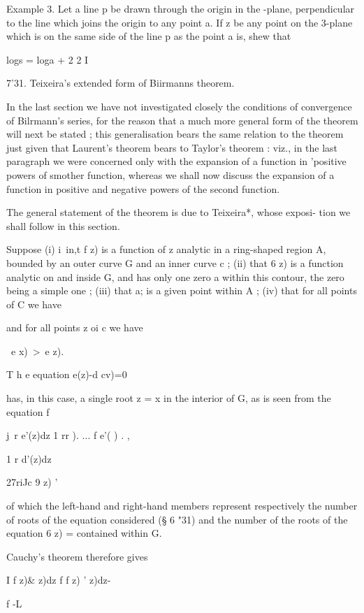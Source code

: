 Example 3. Let a line p be drawn through the origin in the  -plane, perpendicular to 
the line which joins the origin to any point a. If z be any point on the 3-plane which is 
on the same side of the line p as the point a is, shew that 

logs = loga + 2 2   I 

7'31. Teixeira's extended form of Biirmanns theorem. 

In the last section we have not investigated closely the conditions of 
convergence of Bilrmann's series, for the reason that a much more general 
form of the theorem will next be stated ; this generalisation bears the same 
relation to the theorem just given that Laurent's theorem bears to Taylor's 
theorem : viz., in the last paragraph we were concerned only with the 
expansion of a function in 'positive powers of smother function, whereas we 
shall now discuss the expansion of a function in positive and negative powers 
of the second function. 

The general statement of the theorem is due to Teixeira*, whose exposi- 
tion we shall follow in this section. 

Suppose (i) i\ in,t f z) is a function of z analytic in a ring-shaped region A, 
bounded by an outer curve G and an inner curve c ; (ii) that 6  z) is a function 
analytic on and inside G, and has only one zero a within this contour, the zero 
being a simple one ; (iii) that a; is a given point within A ; (iv) that for all 
points   of C we have 

and for all points z oi c we have 

\ e x)\ >\ e z).  

T h e equation e(z)-d cv)=0 

has, in this case, a single root z = x in the interior of G, as is seen from the 
equation f 

j\ r e'(z)dz 1 rr  ).  ... f e'( ) . , 

1 r d'(z)dz 



27riJc 9 z) ' 

of which the left-hand and right-hand members represent respectively the 
number of roots of the equation considered (§ 6 "31) and the number of the 
roots of the equation 6  z) = contained within G. 

Cauchy's theorem therefore gives 

I f z)\& z)dz f f z) ' z)dz- 



f -L 



